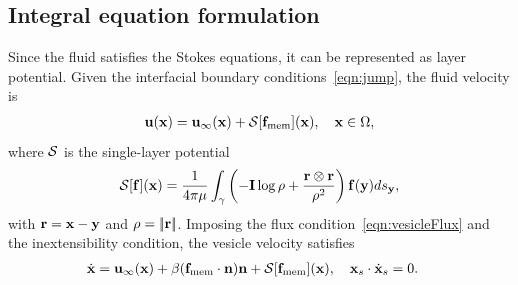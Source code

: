 \documentclass[9pt,twocolumn,twoside,lineno]{pnas-new}
\begin{document}
\subsection*{Integral equation formulation}
Since the fluid satisfies the Stokes equations, it can be represented as
layer potential. Given the interfacial boundary
conditions~\eqref{eqn:jump}, the fluid velocity is
\begin{align}
  \mathbf{u}(\mathbf{x}) = \mathbf{u}_\infty(\mathbf{x}) + \mathcal{S}[\mathbf{f}_\mathrm{mem}](\mathbf{x}), \quad
    \mathbf{x} \in \Omega,
\end{align}
where $\mathcal{S}$ is the single-layer potential
\begin{align}
  \mathcal{S}[\mathbf{f}](\mathbf{x}) = \frac{1}{4\pi\mu} \int_{\gamma} \left(
    -\mathbf{I} \log\rho + \frac{\mathbf{r} \otimes \mathbf{r}}{\rho^2} \right)
    \mathbf{f}(\mathbf{y}) ds_{\mathbf{y}},
\end{align}
with $\mathbf{r} = \mathbf{x} - \mathbf{y}$ and $\rho = |\!| \mathbf{r} |\!|$. Imposing the flux
condition~\eqref{eqn:vesicleFlux} and the inextensibility condition, the
vesicle velocity satisfies
\begin{align}
  \label{eqn:vesVelocity}
  \dot{\mathbf{x}} &= \mathbf{u}_\infty(\mathbf{x}) + \beta (\mathbf{f}_\mathrm{mem}\cdot\mathbf{n})\mathbf{n}
  + \mathcal{S} [\mathbf{f}_\mathrm{mem}](\mathbf{x}),  \quad
  \mathbf{x}_s \cdot \dot{\mathbf{x}}_s = 0.
\end{align}

%
\end{document}
